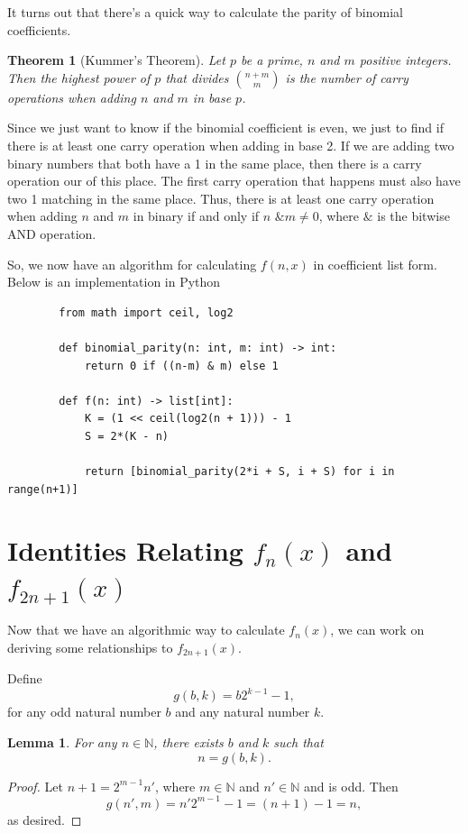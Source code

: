 \documentclass[a4paper]{article}
\newtheorem{lemma}{Lemma}
\newtheorem{theorem}{Theorem}
\newcommand{\N}{\mathbb{N}}
\begin{document}
	It turns out that there's a quick way to calculate the parity of binomial coefficients.
	\begin{theorem}[Kummer's Theorem]
		Let $p$ be a prime, $n$ and $m$ positive integers.
		Then the highest power of $p$ that divides $\binom{n+m}{m}$ is the number of carry operations when adding $n$ and $m$ in base $p$.
	\end{theorem}

	Since we just want to know if the binomial coefficient is even, we just to find if there is at least one carry operation when adding in base 2.
	If we are adding two binary numbers that both have a 1 in the same place, then there is a carry operation our of this place.
	The first carry operation that happens must also have two 1 matching in the same place.
	Thus, there is at least one carry operation when adding $n$ and $m$ in binary if and only if $n \texttt{ \& } m \neq 0$, where $\texttt{\&}$ is the bitwise AND operation.
	
	So, we now have an algorithm for calculating $f(n,x)$ in coefficient list form.
	Below is an implementation in Python
	\begin{center}
	\begin{verbatim}
		from math import ceil, log2
			
		def binomial_parity(n: int, m: int) -> int:
    		return 0 if ((n-m) & m) else 1
			
		def f(n: int) -> list[int]:
    		K = (1 << ceil(log2(n + 1))) - 1
    		S = 2*(K - n)
			
    		return [binomial_parity(2*i + S, i + S) for i in range(n+1)]
	\end{verbatim}
	\end{center}

	\section{Identities Relating $f_n(x)$ and $f_{2n+1}(x)$}
	Now that we have an algorithmic way to calculate $f_n(x)$, we can work on deriving some relationships to $f_{2n+1}(x)$.
	
	Define
	\begin{equation*}
		g(b,k) = b 2^{k-1} - 1,
	\end{equation*}
	for any odd natural number $b$ and any natural number $k$.
	
	\begin{lemma}
		For any $n \in \N$, there exists $b$ and $k$ such that
		\begin{equation*}
			n = g(b,k).
		\end{equation*}
	\end{lemma}
	\begin{proof}
		Let $n+1 = 2^{m-1}n'$, where $m \in \N$ and $n' \in \N$ and is odd.
		Then
		\begin{equation*}
			g(n', m) = n'2^{m-1} - 1 = (n+1) - 1 = n,
		\end{equation*}
		as desired.
	\end{proof}
	
\end{document}
